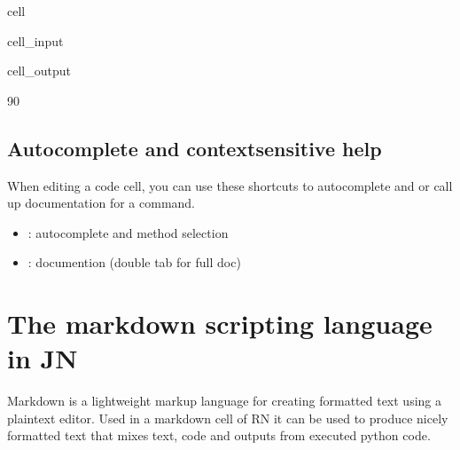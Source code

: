 \documentclass[letterpaper,10pt,english]{jupyterBook}
\begin{document}
\begin{sphinxuseclass}{cell}\begin{sphinxVerbatimInput}

\begin{sphinxuseclass}{cell_input}
\begin{sphinxVerbatim}[commandchars=\\\{\}]
\end{sphinxVerbatim}

\end{sphinxuseclass}\end{sphinxVerbatimInput}
\begin{sphinxVerbatimOutput}

\begin{sphinxuseclass}{cell_output}
\begin{sphinxVerbatim}[commandchars=\\\{\}]
90
\end{sphinxVerbatim}

\end{sphinxuseclass}\end{sphinxVerbatimOutput}

\end{sphinxuseclass}

\subsection{Auto\sphinxhyphen{}complete and context\sphinxhyphen{}sensitive help}
\label{\detokenize{content/04_PythonEssentials/Intro_Jupyter_notebook:auto-complete-and-context-sensitive-help}}
\sphinxAtStartPar
When editing a code cell, you can use these short\sphinxhyphen{}cuts to autocomplete and or call up documentation for a command.
\begin{itemize}
\item {} 
\sphinxAtStartPar
{}: autocomplete and  method selection

\item {} 
\sphinxAtStartPar
{}: documention (double tab for full doc)

\end{itemize}


\section{The markdown scripting language in JN}
\label{\detokenize{content/04_PythonEssentials/Intro_Jupyter_notebook:the-markdown-scripting-language-in-jn}}
\sphinxAtStartPar
Markdown is a lightweight markup language for creating formatted text using a plain\sphinxhyphen{}text editor.  Used in a markdown cell of RN it can be used to produce nicely formatted text that mixes text, code and outputs from executed python code.
\end{document}

